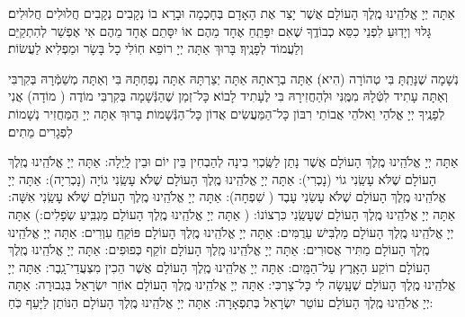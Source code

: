 \documentclass[twoside, openany, parskip=half, 11pt]{book}
\begin{document}
	 אַתָּה יְיָ אֱלֹהֵֽינוּ מֶֽלֶךְ הָעוֹלָם אֲשֶׁר יָצַר אֶת הָאָדָם בְּחָכְמָה וּבָרָא בוֹ נְקָבִים נְקָבִים חֲלוּלִים חֲלוּלִים׃ גָּלוּי וְיָדֽוּעַ לִפְנֵי כִסֵּא כְבוֹדֶֽךָ שֶׁאִם יִפָּתֵֽחַ אֶחָד מֵהֶם אוֹ יִסָּתֵם אֶחָד מֵהֶם אִי אֶפְשַׁר לְהִתְקַיֵּם וְלַעֲמוֹד לְפָנֶֽיךָ׃ בָּרוּךְ אַתָּה יְיָ רוֹפֵא חֽוֹלִי כָל בָּשָׂר וּמַפְלִיא לַעֲשׂוֹת׃


נְשָׁמָה שֶׁנָּתַֽתָּ בִּי טְהוֹרָה (הִיא)׃ אַתָּה בְרָאתָהּ אַתָּה יְצַרְתָּהּ אַתָּה נְפַחְתָּהּ בִּי וְאַתָּה מְשַׁמְּֿרָהּ בְּקִרְבִּי וְאַתָּה עָתִיד לִטְּֿלָהּ מִמֶּֽנִּי וּלְהַחֲזִירָהּ בִּי לֶעָתִיד לָבוֹא׃ כָּל־זְמַן שֶׁהַנְּֿשָׁמָה בְּקִרְבִּי מוֹדֶה (
מוֹדָה) אֲנִי לְפָנֶֽיךָ יְיָ אֱלֹהַי וֵאלֹהֵי אֲבוֹתַי רִבּוֹן כָּל־הַמַּעֲשִׂים אֲדוֹן כָּל־הַנְּֿשָׁמוֹת׃ בָּרוּךְ אַתָּה יְיָ הַמַּחֲזִיר נְשָׁמוֹת לִפְגָרִים מֵתִים׃


אַתָּה יְיָ אֱלֹהֵֽינוּ מֶֽלֶךְ הָעוֹלָם אֲשֶׁר נָתַן לַשֶּֽׂכְוִי בִינָה לְהַבְחִין בֵּין יוֹם וּבֵין לָֽיְלָה:
	 
אַתָּה יְיָ אֱלֹהֵֽינוּ מֶֽלֶךְ הָעוֹלָם שֶׁלֹּא עָשַֽׂנִי גוֹי (נָכְרִי):\hfill \break
{}	 
אַתָּה יְיָ אֱלֹהֵֽינוּ מֶֽלֶךְ הָעוֹלָם שֶׁלֹּא עָשַֽׂנִי גוֹיָה (נָכְרִיָה):\hfill \break
{}
אַתָּה יְיָ אֱלֹהֵֽינוּ מֶֽלֶךְ הָעוֹלָם שֶׁלֹּא עָשַׂנִי עָבֶד  ( שִׁפְחָה):\hfill \break
{}	
 אַתָּה יְיָ אֱלֹהֵֽינוּ מֶֽלֶךְ הָעוֹלָם שֶׁלֹּא עָשַֽׂנִי אִשָּׁה:\hfill \break
    
	אַתָּה יְיָ אֱלֹהֵֽינוּ מֶֽלֶךְ הָעוֹלָם שֶׁעָשַֽׂנִי כִּרְצוֹנוֹ:\hfill \break
( 
אַתָּה יְיָ אֱלֹהֵֽינוּ מֶֽלֶךְ הָעוֹלָם מַגְבִּֽיעַ שְֺפָלִים:)\hfill \break
{}
אַתָּה יְיָ אֱלֹהֵֽינוּ מֶֽלֶךְ הָעוֹלָם מַלְבִּישׁ עַרֻמִּים:\hfill \break
אַתָּה יְיָ אֱלֹהֵֽינוּ מֶֽלֶךְ הָעוֹלָם פּוֹקֵֽחַ עִוְרִים:\hfill \break
אַתָּה יְיָ אֱלֹהֵֽינוּ מֶֽלֶךְ הָעוֹלָם מַתִּיר אֲסוּרִים:\hfill \break
אַתָּה יְיָ אֱלֹהֵֽינוּ מֶֽלֶךְ הָעוֹלָם זוֹקֵף כְּפוּפִים:\hfill \break
אַתָּה יְיָ אֱלֹהֵֽינוּ מֶֽלֶךְ הָעוֹלָם רוֹקַע הָאָֽרֶץ עַל־הַמָּֽיִם:\hfill \break
אַתָּה יְיָ אֱלֹהֵֽינוּ מֶֽלֶךְ הָעוֹלָם אֲשֶׁר הֵכִין מִצְעֲדֵי־גָֽבֶר:\hfill \break
אַתָּה יְיָ אֱלֹהֵֽינוּ מֶֽלֶךְ הָעוֹלָם שֶׁעָֽשָׂה לִי כָּל־צָרְכִּי:\hfill \break
אַתָּה יְיָ אֱלֹהֵֽינוּ מֶֽלֶךְ הָעוֹלָם אוֹזֵר יִשְׂרָאֵל בִּגְבוּרָה:\hfill \break
אַתָּה יְיָ אֱלֹהֵֽינוּ מֶֽלֶךְ הָעוֹלָם עוֹטֵר יִשְׂרָאֵל בְּתִפְאָרָה:\hfill \break
אַתָּה יְיָ אֱלֹהֵֽינוּ מֶֽלֶךְ הָעוֹלָם הַנּוֹתֵן לַיָּעֵף כֹּֽחַ:\hfill \break
\end{document}
